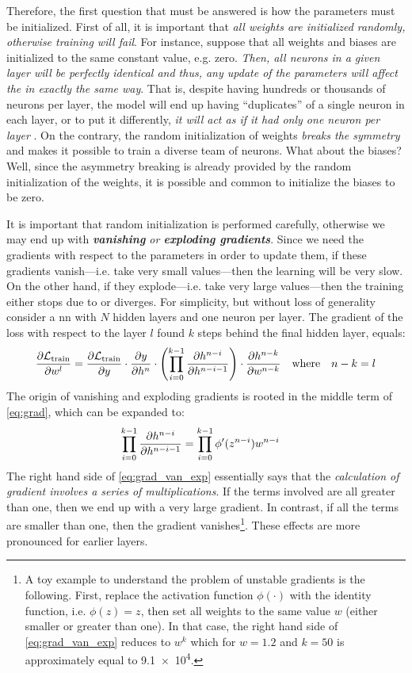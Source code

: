Therefore, the first question that must be answered is how the parameters must
be initialized. First of all, it is important that \emph{all weights are
initialized randomly, otherwise training will fail}. For instance, suppose that
all weights and biases are initialized to the same constant value, e.g. zero.
\emph{Then, all neurons in a given layer will be perfectly identical and thus,
any update of the parameters will affect the in exactly the same way}. That is,
despite having hundreds or thousands of neurons per layer, the model will end up
having ``duplicates'' of a single neuron in each layer, or to put it
differently, \emph{it will act as if it had only one neuron per layer}
\parencite{ml}. On the contrary, the random initialization of weights
\emph{breaks the symmetry} and makes it possible to train a diverse team of
neurons. What about the biases? Well, since the asymmetry breaking is already
provided by the random initialization of the weights, it is possible and common
to initialize the biases to be zero.

It is important that random initialization is performed carefully, otherwise we
may end up with \emph{\textbf{vanishing} or \textbf{exploding
gradients}}. Since we need
the gradients with respect to the parameters in order to update them, if these
gradients vanish---i.e. take very small values---then the learning will be very
slow. On the other hand, if they explode---i.e. take very large values---then
the training either stops due to  or diverges. For simplicity,
but without loss of generality consider a \gls{nn} with $N$ hidden layers and
one neuron per layer. The gradient of the loss with respect to the layer $l$
found $k$ steps behind the final hidden layer, equals:
\begin{equation}
	\label{eq:grad}
	\frac{\partial \mathcal{L}_\text{train}}{\partial w^l} =
	\frac{\partial \mathcal{L}_\text{train}}{\partial y} \cdot \frac{\partial y}{\partial h^n}
	\cdot
    \left(\prod_{i=0}^{k-1} \frac{\partial h^{n-i}}{\partial h^{n-i-1}}\right)
	\cdot
	\frac{\partial h^{n-k}}{\partial w^{n-k}}
	\quad
	\text{where}
	\quad
	n - k = l
\end{equation}
The origin of vanishing and exploding gradients is rooted in the middle term of
\Equation{} \ref{eq:grad}, which can be expanded to:
\begin{equation}
	\label{eq:grad_van_exp}
    \prod_{i=0}^{k-1} \frac{\partial h^{n-i}}{\partial h^{n-i-1}} =
    \prod_{i=0}^{k-1} \phi'(z^{n-i}) w^{n-i}
	\quad
\end{equation}
The right hand side of \Equation{} \ref{eq:grad_van_exp} essentially says that
the \emph{calculation of gradient involves a series of multiplications}. If the
terms involved are all greater than one, then we end up with a very large
gradient. In contrast, if all the terms are smaller than one, then the gradient
vanishes\footnote{A toy example to understand the problem of unstable gradients
is the following. First, replace the activation function $\phi(\cdot)$ with the
identity function, i.e. $\phi(z) = z$, then set all weights to the same value
$w$ (either smaller or greater than one). In that case, the right hand side of
\Equation{} \ref{eq:grad_van_exp} reduces to $w^k$ which for $w=\num{1.2}$ and
$k=\num{50}$ is approximately equal to \num{9.1e4}.}. These effects are more
pronounced for earlier layers.

